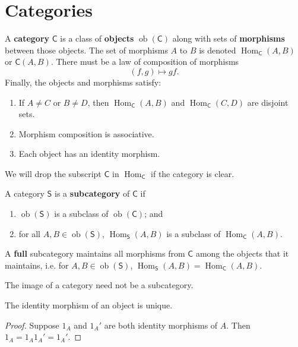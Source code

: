 \documentclass[10pt]{report}
\newcommand{\cat}[1]{\mathsf{#1}}
\DeclareMathOperator{\hh}{Hom}
\DeclareMathOperator{\ob}{ob}
\begin{document}
\tableofcontents


\section{Categories}

\begin{defn}
	A \textbf{category} $\cat{C}$ is a class of \textbf{objects} $\ob(\cat{C})$ along with sets of \textbf{morphisms} between those objects. The set of morphisms $A$ to $B$ is denoted $\hh_{\cat{C}}(A,B)$ or $\cat{C}(A,B)$. There must be a law of composition of morphisms
	\[
		(f, g) \mapsto gf.
	\] Finally, the objects and morphisms satisfy:
	\begin{enumerate}
		\item If $A \neq C$ or $B \neq D$, then $\hh_{\cat{C}}(A,B)$ and $\hh_{\cat{C}}(C,D)$ are disjoint sets.
		\item Morphism composition is associative.
		\item Each object has an identity morphism.
	\end{enumerate}
\end{defn}

We will drop the subscript $\cat{C}$ in $\hh_{\cat{C}}$ if the category is clear.

\begin{defn}
	A category $\cat{S}$ is a \textbf{subcategory} of $\cat{C}$ if
	\begin{enumerate}
		\item $\ob(\cat{S})$ is a subclass of $\ob(\cat{C})$; and
		\item for all $A, B \in \ob(\cat{S})$, $\hh_{\cat{S}}(A,B)$ is a subclass of $\hh_{\cat{C}}(A,B)$.
	\end{enumerate}
	A \textbf{full} subcategory maintains all morphisms from $\cat{C}$ among the objects that it maintains, i.e. for $A, B \in \ob(\cat{S})$, $\hh_{\cat{S}}(A,B) = \hh_{\cat{C}}(A,B)$.
\end{defn}

\begin{note}
The image of a category need not be a subcategory.
\end{note}

\begin{prop}
The identity morphism of an object is unique.
\end{prop}
\begin{proof}
	Suppose $1_{A}$ and $1_{A}'$ are both identity morphisms of $A$. Then $1_{A}=1_{A}1_{A}'=1_{A}'$.
\end{proof}
\end{document}

